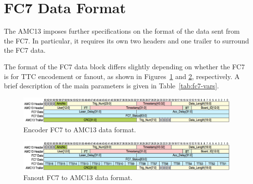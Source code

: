 \section{FC7 Data Format}

The AMC13 imposes further specifications on the format of the data sent from the FC7.  In particular, it requires its own two headers and one trailer to surround the FC7 data.

The format of the FC7 data block differs slightly depending on whether the FC7 is for TTC encodement or fanout, as shown in Figures~\ref{efc7-to-amc13} and \ref{ffc7-to-amc13}, respectively.  A brief description of the main parameters is given in Table~\ref{tab:fc7-vars}.

\vspace*{3em}

\begin{figure}[h]
\hspace{-0.5in}
\includegraphics[width=7.5in]{images/encoder_fc7_data_format.png}
\caption{Encoder FC7 to AMC13 data format.}
\label{efc7-to-amc13}
\end{figure}

\begin{figure}[h]
\hspace{-0.5in}
\includegraphics[width=7.5in]{images/fanout_fc7_data_format.png}
\caption{Fanout FC7 to AMC13 data format.}
\label{ffc7-to-amc13}
\end{figure}

